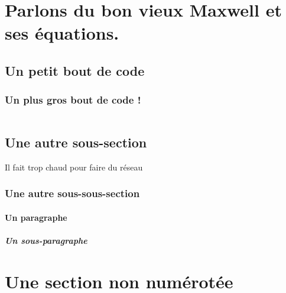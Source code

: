 \section{Parlons du bon vieux Maxwell et ses équations.}

\subsection{Un petit bout de code}


\subsubsection{Un plus gros bout de code !}
\inputminted{python}{src/parts/code/example.py}

\subsection{Une autre sous-section}

Il fait trop chaud pour faire du réseau
\subsubsection{Une autre sous-sous-section}
\paragraph{Un paragraphe}
\subparagraph{Un sous-paragraphe}
\section*{Une section non numérotée}
